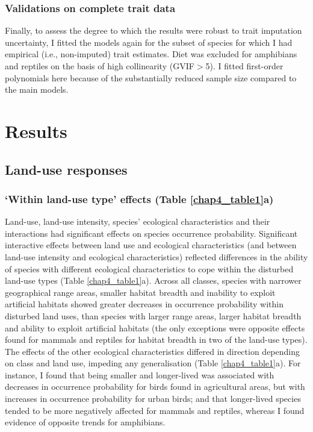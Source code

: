 \begin{itemize}
\subsubsection{Validations on complete trait data}
Finally, to assess the degree to which the results were robust to trait imputation uncertainty, I fitted the models again for the subset of species for which I had empirical (i.e., non-imputed) trait estimates. Diet was excluded for amphibians and reptiles on the basis of high collinearity (GVIF$>$5). I fitted first-order polynomials here because of the substantially reduced sample size compared to the main models.

\end{itemize}




\section{Results}

\subsection{Land-use responses}

\subsubsection{`Within land-use type' effects (Table \ref{chap4_table1}a)}
Land-use, land-use intensity, species' ecological characteristics and their interactions had significant effects on species occurrence probability. Significant interactive effects between land use and ecological characteristics (and between land-use intensity and ecological characteristics) reflected differences in the ability of species with different ecological characteristics to cope within the disturbed land-use types (Table \ref{chap4_table1}a). Across all classes, species with narrower geographical range areas, smaller habitat breadth and inability to exploit artificial habitats showed greater decreases in occurrence probability within disturbed land uses, than species with larger range areas, larger habitat breadth and ability to exploit artificial habitats (the only exceptions were opposite effects found for mammals and reptiles for habitat breadth in two of the land-use types). The effects of the other ecological characteristics differed in direction depending on class and land use, impeding any generalisation (Table \ref{chap4_table1}a). For instance, I found that being smaller and longer-lived was associated with decreases in occurrence probability for birds found in agricultural areas, but with increases in occurrence probability for urban birds; and that  longer-lived species tended to be more negatively affected for mammals and reptiles, whereas I found evidence of opposite trends for amphibians.

